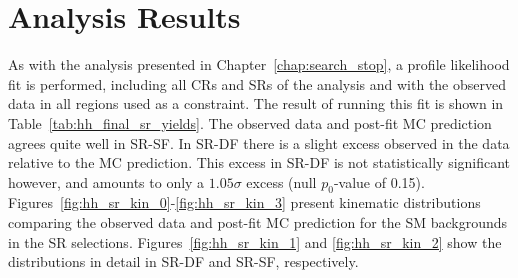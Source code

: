 \section{Analysis Results}
\label{sec:hh_results}

As with the analysis presented in Chapter~\ref{chap:search_stop}, a profile likelihood
fit is performed, including all CRs and SRs of the analysis and with the observed
data in all regions used as a constraint.
The result of running this fit is shown in Table~\ref{tab:hh_final_sr_yields}.
The observed data and post-fit MC prediction agrees quite well in SR-SF.
In SR-DF there is a slight excess observed in the data relative to the MC prediction.
This excess in SR-DF is not statistically significant however, and amounts to only a $1.05\sigma$ excess
(null $p_0$-value of 0.15).
Figures~\ref{fig:hh_sr_kin_0}-\ref{fig:hh_sr_kin_3} present kinematic distributions comparing
the observed data and post-fit MC prediction for the SM backgrounds in the SR selections.
Figures~\ref{fig:hh_sr_kin_1} and \ref{fig:hh_sr_kin_2} show the \dhh distributions in detail
in SR-DF and SR-SF, respectively.

